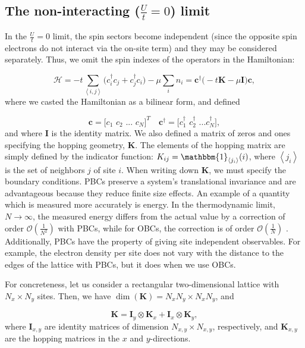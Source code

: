 \subsection{The non-interacting ($\frac{U}{t} = 0$) limit}

In the $\frac{U}{t} = 0$ limit, the spin sectors become independent (since the opposite spin electrons do not interact via the on-site term) and they may be considered separately.
Thus, we omit the spin indexes of the operators in the Hamiltonian:

\begin{equation}
\mathcal{H} = -t \sum_{\left\langle i, j \right\rangle} \bigg( c_i^\dagger c_j + c_j^\dagger c_i \bigg) - \mu \sum_i n_i = \bm c^\dagger \bigg( -t \bm K - \mu \bm I \bigg) \bm c ,
\end{equation}
where we casted the Hamiltonian as a bilinear form, and defined

\begin{equation}
\bm c = \bigg[ c_1 \,\, c_2 \,\, ... \,\, c_N \bigg]^T \quad \bm c^\dagger = \bigg[c_1^\dagger \,\, c_2^\dagger \,\, ... c_N^\dagger \bigg] ,
\end{equation}
and where $\bm I$ is the identity matrix.
We also defined a matrix of zeros and ones specifying the hopping geometry, $\bm K$. The elements of the hopping matrix are simply defined by the indicator function: $K_{ij} = \mathbbm{1}_{\left\langle j_i \right\rangle} (i)$, where $\left\langle j_i \right\rangle$ is the set of neighbors $j$ of site $i$.
When writing down $\bm K$, we must specify the boundary conditions.
\acp{PBC} preserve a system's translational invariance and are advantageous because they reduce finite size effects.
An example of a quantity which is measured more accurately is energy.
In the thermodynamic limit, $N \rightarrow \infty$, the measured energy differs from the actual value by a correction of order $\mathcal{O}(\frac{1}{N^2})$ with \acp{PBC}, while for \acp{OBC}, the correction is of order $\mathcal{O}(\frac{1}{N})$ \cite{hou_numerical_2009}.
Additionally, \acp{PBC} have the property of giving site independent observables.
For example, the electron density per site does not vary with the distance to the edges of the lattice with \acp{PBC}, but it does when we use \acp{OBC}.

For concreteness, let us consider a rectangular two-dimensional lattice with $N_x \times N_y$ sites. Then, we have $\dim(\bm K) = N_x N_y \times N_x N_y $, and

\begin{equation}
\bm K = \bm I_y \otimes \bm K_x + \bm I_x \otimes \bm K_y ,
\end{equation}
where $\bm I_{x, y}$ are identity matrices of dimension $N_{x, y} \times N_{x, y}$, respectively, and $\bm K_{x, y}$ are the hopping matrices in the $x$ and $y$-directions.

